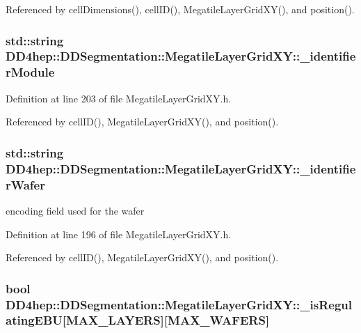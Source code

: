 Referenced by cellDimensions(), cellID(), MegatileLayerGridXY(), and position().\hypertarget{class_d_d4hep_1_1_d_d_segmentation_1_1_megatile_layer_grid_x_y_ac694e7f1d8e601f1893f84fb8bb6286f}{
\subsubsection[{\_\-identifierModule}]{\setlength{\rightskip}{0pt plus 5cm}std::string {\bf DD4hep::DDSegmentation::MegatileLayerGridXY::\_\-identifierModule}}}
\label{class_d_d4hep_1_1_d_d_segmentation_1_1_megatile_layer_grid_x_y_ac694e7f1d8e601f1893f84fb8bb6286f}


Definition at line 203 of file MegatileLayerGridXY.h.

Referenced by cellID(), MegatileLayerGridXY(), and position().\hypertarget{class_d_d4hep_1_1_d_d_segmentation_1_1_megatile_layer_grid_x_y_a97bf5f24b4c9a44f74ae5c245c13c824}{
\subsubsection[{\_\-identifierWafer}]{\setlength{\rightskip}{0pt plus 5cm}std::string {\bf DD4hep::DDSegmentation::MegatileLayerGridXY::\_\-identifierWafer}}}
\label{class_d_d4hep_1_1_d_d_segmentation_1_1_megatile_layer_grid_x_y_a97bf5f24b4c9a44f74ae5c245c13c824}


encoding field used for the wafer 

Definition at line 196 of file MegatileLayerGridXY.h.

Referenced by cellID(), MegatileLayerGridXY(), and position().\hypertarget{class_d_d4hep_1_1_d_d_segmentation_1_1_megatile_layer_grid_x_y_a46909b6552b97789492f2b8c97ed8cb6}{
\subsubsection[{\_\-isRegulatingEBU}]{\setlength{\rightskip}{0pt plus 5cm}bool {\bf DD4hep::DDSegmentation::MegatileLayerGridXY::\_\-isRegulatingEBU}\mbox{[}MAX\_\-LAYERS\mbox{]}\mbox{[}MAX\_\-WAFERS\mbox{]}}}
\label{class_d_d4hep_1_1_d_d_segmentation_1_1_megatile_layer_grid_x_y_a46909b6552b97789492f2b8c97ed8cb6}


